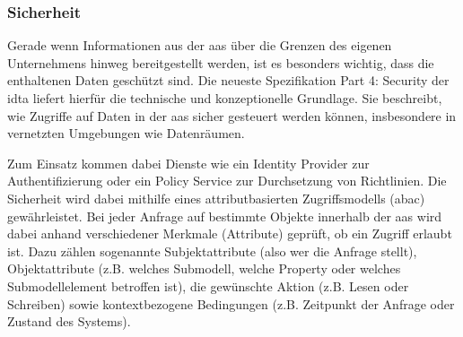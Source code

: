 
\subsubsection{Sicherheit}
Gerade wenn Informationen aus der \acs{aas} über die Grenzen des eigenen Unternehmens hinweg bereitgestellt werden, ist es besonders wichtig, dass die enthaltenen Daten geschützt sind. 
Die neueste Spezifikation Part 4: Security \cite{SpezifikationPart4} der \acs{idta} liefert hierfür die technische und konzeptionelle Grundlage.
Sie  beschreibt, wie Zugriffe auf Daten in der \acs{aas} sicher gesteuert werden können, insbesondere in vernetzten Umgebungen wie Datenräumen.

Zum Einsatz kommen dabei Dienste wie ein Identity Provider zur Authentifizierung oder ein Policy Service zur Durchsetzung von Richtlinien.
Die Sicherheit wird dabei mithilfe eines attributbasierten Zugriffsmodells (\ac{abac}) gewährleistet.
Bei jeder Anfrage auf bestimmte Objekte innerhalb der \acs{aas} wird dabei anhand verschiedener Merkmale (Attribute) geprüft, ob ein Zugriff erlaubt ist.
Dazu zählen sogenannte Subjektattribute (also wer die Anfrage stellt), Objektattribute (z.B. welches Submodell, welche Property oder welches Submodellelement betroffen ist), die gewünschte Aktion (z.B. Lesen oder Schreiben) sowie kontextbezogene Bedingungen (z.B. Zeitpunkt der Anfrage oder Zustand des Systems).

